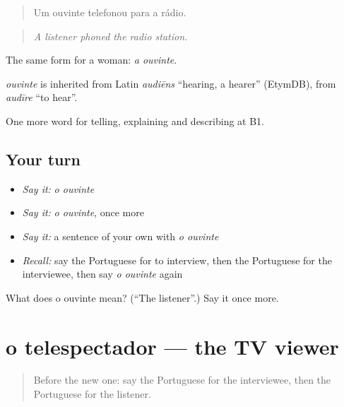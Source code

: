 \begin{quote}
Um ouvinte telefonou para a rádio.
\end{quote}

\begin{quote}
\emph{A listener phoned the radio station.}
\end{quote}

The same form for a woman: \emph{a ouvinte}.

\begin{cousinweb}
\emph{ouvinte} is inherited from Latin \emph{audiēns} \textquotedblleft{}hearing, a hearer\textquotedblright{} (EtymDB), from \emph{audīre} \textquotedblleft{}to hear\textquotedblright{}.
\end{cousinweb}

\begin{grammarlens}[title={What you've built}]
One more word for telling, explaining and describing at B1.
\end{grammarlens}

\subsection*{Your turn}
\begin{itemize}
\raggedright
  \item \emph{Say it:} \emph{o ouvinte}
  \item \emph{Say it:} \emph{o ouvinte}, once more
  \item \emph{Say it:} a sentence of your own with \emph{o ouvinte}
  \item \emph{Recall:} say the Portuguese for to interview, then the Portuguese for the interviewee, then say \emph{o ouvinte} again
\end{itemize}

\begin{tcolorbox}[breakable,colback=teal!4,colframe=teal!35!black,title={Before you move on}]
What does o ouvinte mean? (\textquotedblleft{}The listener\textquotedblright{}.) Say it once more.
\end{tcolorbox}
\section[o telespectador]{o telespectador — the TV viewer}

\label{lesson:PT-C285-telespectador}



\begin{quote}
Before the new one: say the Portuguese for the interviewee, then the Portuguese for the listener.
\end{quote}

